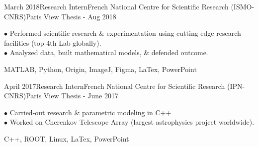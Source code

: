 
\vspace*{-10px} 
\begin{experiences}
  \experience
    {March 2018}{Research Intern}{French National Centre for Scientific Research (ISMO-CNRS)}{Paris \hspace{7ex} \hfil {} {\footnotesize{View Thesis}}}
    {- Aug 2018}
    {
\begin{description}
$\bullet$ Performed scientific research \& experimentation using cutting-edge research facilities (top 4th Lab globally). 
\\$\bullet$ Analyzed data, built mathematical models, \& defended outcome. \hspace{125pt} 
\end{description}
}
    {MATLAB, Python, Origin, ImageJ, Figma, LaTex, PowerPoint}
\end{experiences}
\vspace*{-15px} 
\begin{experiences}
  \experience
    {April 2017}{Research Intern}{French National Centre for Scientific Research (IPN-CNRS)}{Paris  \hspace{8ex} \hfil{} {\footnotesize{View Thesis}}}
    {- June 2017}
    {
\begin{description}
$\bullet$ Carried-out research \& parametric modeling in C++ 
\\$\bullet$ Worked on Cherenkov Telescope Array (largest astrophysics project worldwide). \hfill 
\end{description}
}
    {C++, ROOT, Linux, LaTex, PowerPoint}
\end{experiences} 
